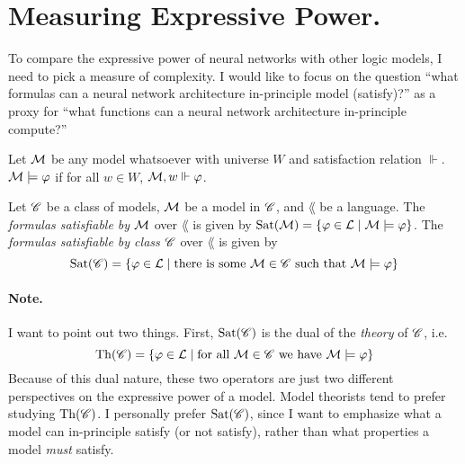 \documentclass[letterpaper]{article}
\begin{document}




\section*{Measuring Expressive Power.} 

To compare the expressive power of neural networks with other logic models, I need to pick a measure of complexity.  I would like to focus on the question ``what formulas can a neural network architecture in-principle model (satisfy)?'' as a proxy for ``what functions can a neural network architecture in-principle compute?''

\begin{definition}
    Let $\mathcal{M}$ be any model whatsoever with universe $W$ and satisfaction relation $\Vdash$.  $\mathcal{M} \models \varphi$ if for all $w \in W$, $\mathcal{M}, w \Vdash \varphi$.
\end{definition}

\begin{definition}
    Let $\mathscr{C}$ be a class of models, $\mathcal{M}$ be a model in $\mathscr{C}$, and $\lang$ be a language.  The \emph{formulas satisfiable by} $\mathcal{M}$ over $\lang$ is given by $\mathrm{Sat}( \mathcal{M} ) = \{ \varphi \in \mathcal{L} \mid \mathcal{M} \models \varphi \}$.  The \emph{formulas satisfiable by class $\mathscr{C}$} over $\lang$ is given by 
    \[
        \mathrm{Sat}( \mathscr{C} ) = \{ \varphi \in \mathcal{L} \mid \textrm{there is some } \mathcal{M} \in \mathscr{C} \textrm{ such that } \mathcal{M} \models \varphi \}
    \]
\end{definition}

\paragraph*{Note.}  I want to point out two things.  First, $\mathrm{Sat}( \mathscr{C} )$ is the dual of the \emph{theory} of $\mathscr{C}$, i.e.
\[
    \mathrm{Th}( \mathscr{C} ) = \{ \varphi \in \mathcal{L} \mid \textrm{for all } \mathcal{M} \in \mathscr{C} \textrm{ we have } \mathcal{M} \models \varphi \}
\]
Because of this dual nature, these two operators are just two different perspectives on the expressive power of a model.  Model theorists tend to prefer studying $\mathrm{Th}( \mathscr{C} )$.  I personally prefer $\mathrm{Sat}( \mathscr{C} )$, since I want to emphasize what a model can in-principle satisfy (or not satisfy), rather than what properties a model \emph{must} satisfy.
\end{document}
